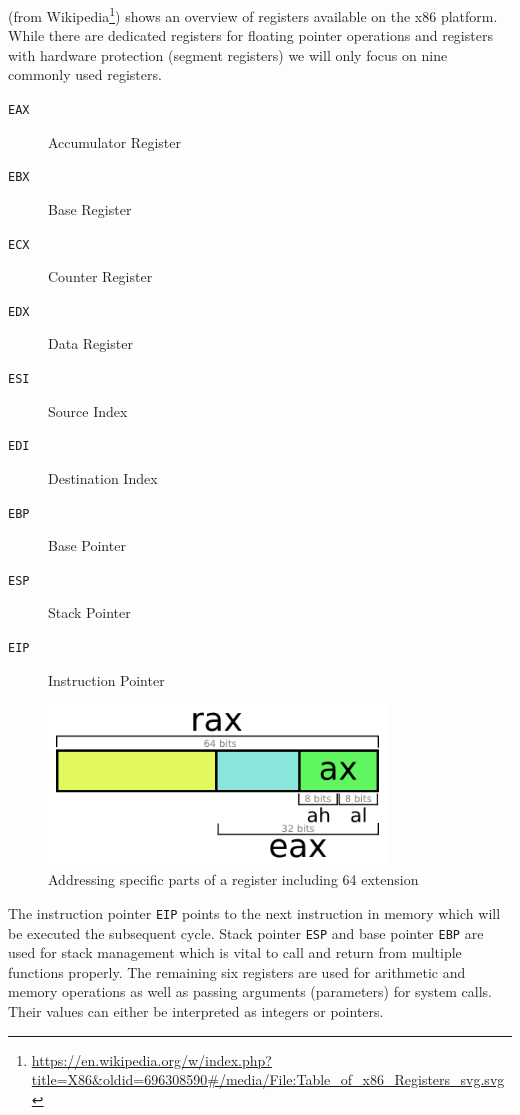 \documentclass[article]{uibk}
\begin{document}
 (from
Wikipedia\footnote{\url{https://en.wikipedia.org/w/index.php?title=X86&oldid=696308590\#/media/File:Table_of_x86_Registers_svg.svg}})
shows an overview of registers available on the x86 platform. While there are
dedicated registers for floating pointer operations and registers with hardware
protection (segment registers) we will only focus on nine commonly used
registers.

\begin{minipage}[t]{0.4\textwidth}
    \begin{description}
        \item[\texttt{EAX}] Accumulator Register
        \item[\texttt{EBX}] Base Register
        \item[\texttt{ECX}] Counter Register
        \item[\texttt{EDX}] Data Register
        \item[\texttt{ESI}] Source Index
        \item[\texttt{EDI}] Destination Index
        \item[\texttt{EBP}] Base Pointer
        \item[\texttt{ESP}] Stack Pointer
        \item[\texttt{EIP}] Instruction Pointer
    \end{description}
\end{minipage}
\begin{minipage}[t]{0.6\textwidth}
    \begin{figure}[H]
        \centering
        \includegraphics[width=0.8\textwidth]{gfx/single_register.png}
        \caption{Addressing specific parts of a register including \SI{64}{\bit} extension}
        \label{fig:single_register}
    \end{figure}
\end{minipage}
\bigskip

The instruction pointer \texttt{EIP} points to the next instruction in memory
which will be executed the subsequent cycle. Stack pointer \texttt{ESP} and
base pointer \texttt{EBP} are used for stack management which is vital to call
and return from multiple functions properly. The remaining six registers are
used for arithmetic and memory operations as well as passing arguments
(parameters) for system calls. Their values can either be interpreted as
integers or pointers.
\end{document}
